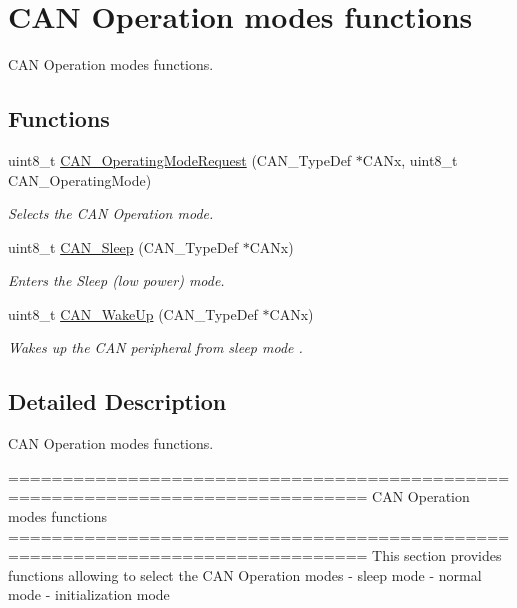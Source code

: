 \hypertarget{group___c_a_n___group4}{\section{C\-A\-N Operation modes functions}
\label{group___c_a_n___group4}
}


C\-A\-N Operation modes functions.  


\subsection*{Functions}
\begin{DoxyCompactItemize}
\item 
uint8\-\_\-t \hyperlink{group___c_a_n___group4_gab2a3630e9e3024114eb117d14e514208}{C\-A\-N\-\_\-\-Operating\-Mode\-Request} (C\-A\-N\-\_\-\-Type\-Def $\ast$C\-A\-Nx, uint8\-\_\-t C\-A\-N\-\_\-\-Operating\-Mode)
\begin{DoxyCompactList}\small\item\em Selects the C\-A\-N Operation mode. \end{DoxyCompactList}\item 
uint8\-\_\-t \hyperlink{group___c_a_n___group4_ga640215e38765759d7eceb8a039046667}{C\-A\-N\-\_\-\-Sleep} (C\-A\-N\-\_\-\-Type\-Def $\ast$C\-A\-Nx)
\begin{DoxyCompactList}\small\item\em Enters the Sleep (low power) mode. \end{DoxyCompactList}\item 
uint8\-\_\-t \hyperlink{group___c_a_n___group4_ga78cdfbf1884b9e33c552bcbca15bed10}{C\-A\-N\-\_\-\-Wake\-Up} (C\-A\-N\-\_\-\-Type\-Def $\ast$C\-A\-Nx)
\begin{DoxyCompactList}\small\item\em Wakes up the C\-A\-N peripheral from sleep mode . \end{DoxyCompactList}\end{DoxyCompactItemize}


\subsection{Detailed Description}
C\-A\-N Operation modes functions. \begin{DoxyVerb} ===============================================================================
                      CAN Operation modes functions
 ===============================================================================  
  This section provides functions allowing to select the CAN Operation modes
  - sleep mode
  - normal mode 
  - initialization mode\end{DoxyVerb}
 

